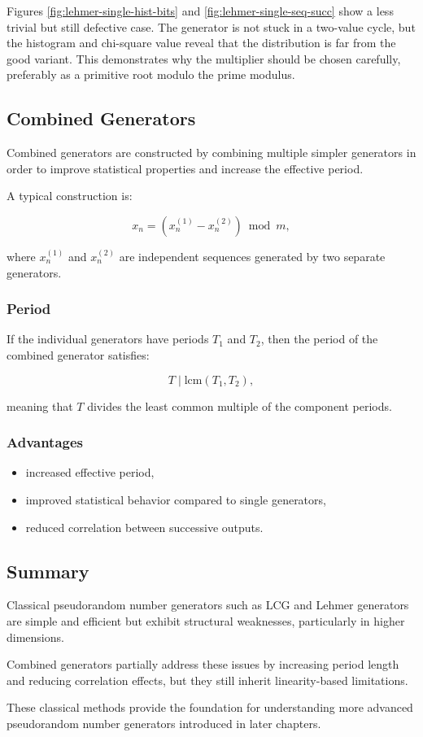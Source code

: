 Figures \ref{fig:lehmer-single-hist-bits} and \ref{fig:lehmer-single-seq-succ} show a less trivial but still defective case. The generator is not stuck in a two-value cycle, but the histogram and chi-square value reveal that the distribution is far from the good variant. This demonstrates why the multiplier should be chosen carefully, preferably as a primitive root modulo the prime modulus.
\newpage
\subsection{Combined Generators}

Combined generators are constructed by combining multiple simpler generators in order to improve statistical properties and increase the effective period.

A typical construction is:

\[
x_n = (x_n^{(1)} - x_n^{(2)}) \bmod m,
\]

where $x_n^{(1)}$ and $x_n^{(2)}$ are independent sequences generated by two separate generators.

\subsubsection{Period}

If the individual generators have periods $T_1$ and $T_2$, then the period of the combined generator satisfies:

\[
T \mid \mathrm{lcm}(T_1, T_2),
\]

meaning that $T$ divides the least common multiple of the component periods.

\subsubsection{Advantages}

\begin{itemize}
    \item increased effective period,
    \item improved statistical behavior compared to single generators,
    \item reduced correlation between successive outputs.
\end{itemize}

\subsection{Summary}

Classical pseudorandom number generators such as LCG and Lehmer generators are simple and efficient but exhibit structural weaknesses, particularly in higher dimensions.

Combined generators partially address these issues by increasing period length and reducing correlation effects, but they still inherit linearity-based limitations.

These classical methods provide the foundation for understanding more advanced pseudorandom number generators introduced in later chapters.
